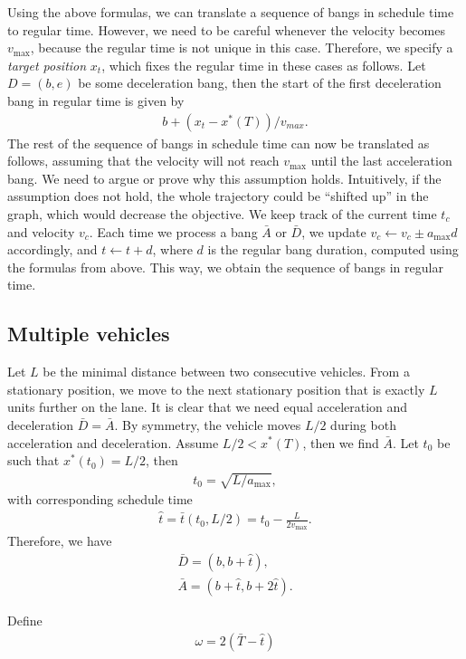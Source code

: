\documentclass[a4paper]{article}
\theoremstyle{definition}
\theoremstyle{plain}
\begin{document}
Using the above formulas, we can translate a sequence of bangs in schedule time
to regular time. However, we need to be careful whenever the velocity becomes
$v_{\max}$, because the regular time is not unique in this case. Therefore, we
specify a \textit{target position} $x_{t}$, which fixes the regular time in
these cases as follows. Let $D=(b,e)$ be some deceleration bang, then the start
of the first deceleration bang in regular time is given by
\begin{align*}
  b + (x_{t} - x^{*}(T)) / v_{max} .
\end{align*}
%
The rest of the sequence of bangs in schedule time can now be translated as
follows, assuming that the velocity will not reach $v_{\max}$ until the last
acceleration bang. {\color{blue} We need to argue or prove why this assumption
  holds. Intuitively, if the assumption does not hold, the whole trajectory
  could be ``shifted up'' in the graph, which would decrease the objective.} We
keep track of the current time $t_{c}$ and velocity $v_{c}$. Each time we
process a bang $\bar{A}$ or $\bar{D}$, we update $v_{c} \leftarrow v_{c} \pm a_{\max} d$
accordingly, and $t \leftarrow t + d$, where $d$ is the regular bang duration, computed
using the formulas from above. This way, we obtain the sequence of bangs in
regular time.

\subsection*{Multiple vehicles}

Let $L$ be the minimal distance between two consecutive vehicles. From a
stationary position, we move to the next stationary position that is exactly $L$
units further on the lane. It is clear that we need equal acceleration and
deceleration $\bar{D}=\bar{A}$. By symmetry, the vehicle moves $L/2$ during both
acceleration and deceleration.
%
Assume $L/2 < x^{*}(T)$, then we find $\bar{A}$.
Let $t_{0}$ be such that $x^{*}(t_{0}) = L/2$, then
\begin{align*}
t_{0} = \sqrt{L / a_{\max}} ,
\end{align*}
with corresponding schedule time
\begin{align*}
  \hat{t} = \bar{t}(t_{0}, L/2) = t_{0} - \frac{L}{2 v_{\max}} .
\end{align*}
Therefore, we have
\begin{align*}
  \bar{D} = (b, b + \hat{t}) , \\
  \bar{A} = (b + \hat{t}, b + 2 \hat{t}) .
\end{align*}


Define
\begin{align*}
  \omega = 2 ( \bar{T} - \hat{t} )
\end{align*}
\end{document}
